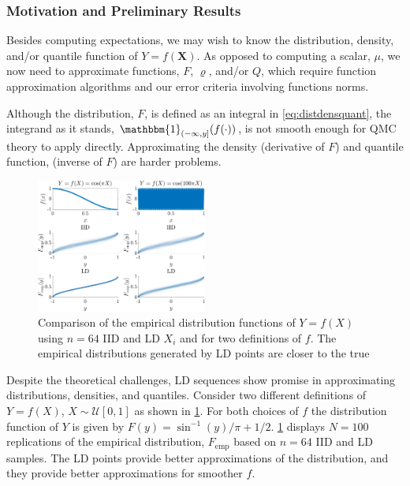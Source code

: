 \documentclass[11pt]{NSFamsart}
\newcommand{\bbone}{\mathbbm{1}}
\newcommand{\bX}{{\boldsymbol{X}}}
\newcommand{\calu}{{\mathcal{U}}}
\begin{document}

\subsubsection{Motivation and Preliminary Results}
Besides computing expectations, we may wish to know the distribution, density, and/or quantile function of $Y = f(\bX)$.  As opposed to computing a scalar, $\mu$, we now need to approximate functions, $F$, $\varrho$, and/or $Q$, which require function approximation algorithms and our error criteria involving functions norms.

Although the distribution, $F$, is defined as an integral in \cref{eq:distdensquant}, the integrand as it stands, $\bbone_{(-\infty,y]}(f(\cdot))$, is not smooth enough for  QMC theory to apply directly.  Approximating the density (derivative of $F$) and quantile function, (inverse of $F$) are harder problems.

\begin{figure}
	\centering
	\includegraphics[width = 0.5\textwidth]{ProgramsImages/distribExperEG.pdf}
	\caption{Comparison of the empirical distribution functions of $Y = f(X)$ using $n=64$ IID and LD $X_i$ and for two definitions of $f$. The empirical distributions generated by LD points are closer to the true} \label{fig:empdistcomp}
\end{figure}

Despite the theoretical challenges, LD sequences show promise in approximating distributions, densities, and quantiles.  Consider two different definitions of $Y = f(X)$, $X \sim \calu[0,1]$ as shown in \cref{fig:empdistcomp}.  For both choices of $f$ the distribution function of $Y$ is given by $F(y) = \sin^{-1}(y)/\pi + 1/2$.  \cref{fig:empdistcomp} displays $N = 100$ replications of the empirical distribution, $F_{\mathrm{emp}}$ based on $n=64$ IID and LD samples.  The  LD points provide better approximations of the distribution, and they provide better approximations for smoother $f$.
\end{document}
